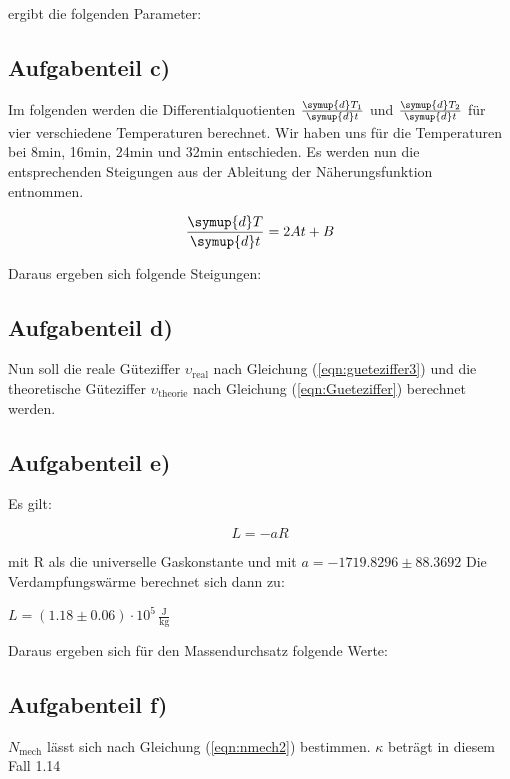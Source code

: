         ergibt die folgenden Parameter:

        


        \subsection{Aufgabenteil c)}

        Im folgenden werden die Differentialquotienten $\frac{\symup{d} T_1}{\symup{d} t}$ und $\frac{\symup{d} T_2}{\symup{d} t}$ für vier verschiedene Temperaturen berechnet.
        Wir haben uns für die Temperaturen bei 8min, 16min, 24min und 32min entschieden.
        Es werden nun die entsprechenden Steigungen aus der Ableitung der Näherungsfunktion entnommen.

        \begin{equation}
        \frac{\symup{d}T}{\symup{d}t} = 2At + B
        \end{equation}

        Daraus ergeben sich folgende Steigungen:
        
        


        \newpage
        \subsection{Aufgabenteil d)}

        Nun soll die reale Güteziffer $\upsilon_\text{real}$ nach Gleichung (\ref{eqn:gueteziffer3}) und die theoretische Güteziffer $\upsilon_\text{theorie}$ nach Gleichung (\ref{eqn:Gueteziffer}) berechnet werden.

        



        \subsection{Aufgabenteil e)}

        Es gilt:

        \begin{equation}
        L=-aR
        \label{eqn:verdampfungswaerme}
        \end{equation}

        mit R als die universelle Gaskonstante und mit $a=-1719.8296 \pm 88.3692$
        Die Verdampfungswärme berechnet sich dann zu:

        $L=(1{.}18 \pm 0{.}06) \cdot 10^{5}\,\mathrm{\frac{J}{kg}}$

        Daraus ergeben sich für den Massendurchsatz folgende Werte:
        
        

        \newpage
        \subsection{Aufgabenteil f)}

        $N_\text{mech}$ lässt sich nach Gleichung (\ref{eqn:nmech2}) bestimmen.
        $\kappa$ beträgt in diesem Fall 1.14

        

        